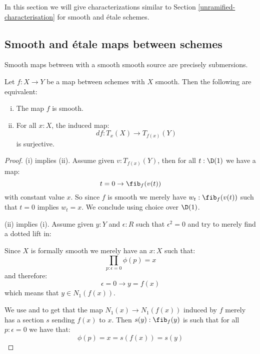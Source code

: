 In this section we will give characterizations similar to Section \ref{unramified-characterisation} for smooth and étale schemes.

\subsection{Smooth and étale maps between schemes}

Smooth maps between with a smooth smooth source are precisely submersions.

\begin{corollary}\label{smooth-schemes-iff-submersion}
Let $f:X\to Y$ be a map between schemes with $X$ smooth. Then the following are equivalent:
\begin{enumerate}[(i)] 
\item The map $f$ is smooth.
\item For all $x:X$, the induced map:
\[df : T_x(X)\to T_{f(x)}(Y)\]
is surjective.
\end{enumerate}
\end{corollary}

\begin{proof}
(i) implies (ii). Assume given $v:T_{f(x)}(Y)$, then for all $t:\D(1)$ we have a map:
\[t=0 \to \fib_f(v(t))\]
with constant value $x$. So since $f$ is smooth we merely have $w_t:\fib_f(v(t))$ such that $t=0$ implies $w_t=x$. We conclude using choice over $\D(1)$.

(ii) implies (i). Assume given $y:Y$ and $\epsilon:R$ such that $\epsilon^2=0$ and try to merely find a dotted lift in:
 \begin{center}
    \end{center}
    Since $X$ is formally smooth we merely have an $x:X$ such that:
\[\prod_{p:\epsilon=0} \phi(p)=x\]
and therefore:
\[ \epsilon=0 \to y=f(x)\]
which means that $y\in N_1(f(x))$. 

We use  and  to get that the map $N_1(x)\to N_1(f(x))$ induced by $f$ merely has a section $s$ sending $f(x)$ to $x$. Then $s(y):\fib_f(y)$ is such that for all $p:\epsilon=0$ we have that:
\[\phi(p) = x = s(f(x)) = s(y)\]
\end{proof}

